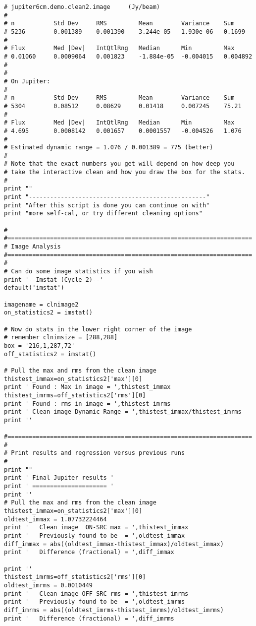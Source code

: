 \begin{verbatim}
# jupiter6cm.demo.clean2.image     (Jy/beam)
# 
# n           Std Dev     RMS         Mean        Variance    Sum
# 5236        0.001389    0.001390    3.244e-05   1.930e-06   0.1699    
# 
# Flux        Med |Dev|   IntQtlRng   Median      Min         Max
# 0.01060     0.0009064   0.001823    -1.884e-05  -0.004015   0.004892  
# 
# 
# On Jupiter:
# 
# n           Std Dev     RMS         Mean        Variance    Sum
# 5304        0.08512     0.08629     0.01418     0.007245    75.21     
# 
# Flux        Med |Dev|   IntQtlRng   Median      Min         Max
# 4.695       0.0008142   0.001657    0.0001557   -0.004526   1.076     
#
# Estimated dynamic range = 1.076 / 0.001389 = 775 (better)
#
# Note that the exact numbers you get will depend on how deep you
# take the interactive clean and how you draw the box for the stats.
#
print ""
print "--------------------------------------------------"
print "After this script is done you can continue on with"
print "more self-cal, or try different cleaning options"

#
#=====================================================================
# Image Analysis
#=====================================================================
#
# Can do some image statistics if you wish
print '--Imstat (Cycle 2)--'
default('imstat')

imagename = clnimage2
on_statistics2 = imstat()

# Now do stats in the lower right corner of the image
# remember clnimsize = [288,288]
box = '216,1,287,72'
off_statistics2 = imstat()

# Pull the max and rms from the clean image
thistest_immax=on_statistics2['max'][0]
print ' Found : Max in image = ',thistest_immax
thistest_imrms=off_statistics2['rms'][0]
print ' Found : rms in image = ',thistest_imrms
print ' Clean image Dynamic Range = ',thistest_immax/thistest_imrms
print ''

#=====================================================================
#
# Print results and regression versus previous runs
#
print ""
print ' Final Jupiter results '
print ' ===================== '
print ''
# Pull the max and rms from the clean image
thistest_immax=on_statistics2['max'][0]
oldtest_immax = 1.07732224464
print '   Clean image  ON-SRC max = ',thistest_immax
print '   Previously found to be  = ',oldtest_immax
diff_immax = abs((oldtest_immax-thistest_immax)/oldtest_immax)
print '   Difference (fractional) = ',diff_immax

print ''
thistest_imrms=off_statistics2['rms'][0]
oldtest_imrms = 0.0010449
print '   Clean image OFF-SRC rms = ',thistest_imrms
print '   Previously found to be  = ',oldtest_imrms
diff_imrms = abs((oldtest_imrms-thistest_imrms)/oldtest_imrms)
print '   Difference (fractional) = ',diff_imrms


\end{verbatim}
